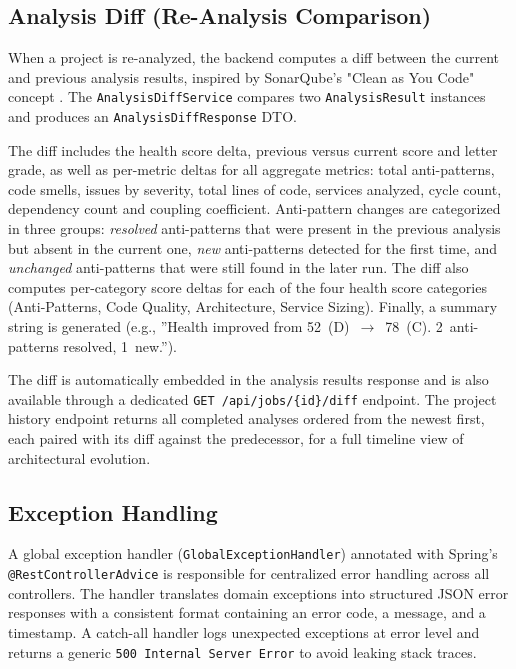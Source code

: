 \subsection{Analysis Diff (Re-Analysis Comparison)}
\label{subsec:analysis-diff}

 \par When a project is re-analyzed, the backend computes a diff between the current and previous analysis results, inspired by SonarQube's "Clean as You Code" concept \cite{SonQ}. The \texttt{AnalysisDiffService} compares two \texttt{AnalysisResult} instances and produces an \texttt{AnalysisDiffResponse} DTO.

The diff includes the health score delta, previous versus current score and letter grade, as well as per-metric deltas for all aggregate metrics: total anti-patterns, code smells, issues by severity, total lines of code, services analyzed, cycle count, dependency count and coupling coefficient. Anti-pattern changes are categorized in three groups: \textit{resolved} anti-patterns that were present in the previous analysis but absent in the current one, \textit{new} anti-patterns detected for the first time, and \textit{unchanged} anti-patterns that were still found in the later run. The diff also computes per-category score deltas for each of the four health score categories (Anti-Patterns, Code Quality, Architecture, Service Sizing). Finally, a summary string is generated (e.g., ''Health improved from 52~(D)~$\to$~78~(C). 2~anti-patterns resolved, 1~new.'').

The diff is automatically embedded in the analysis results response and is also available through a dedicated \texttt{GET /api/jobs/\{id\}/diff} endpoint. The project history endpoint returns all completed analyses ordered from the newest first, each paired with its diff against the predecessor, for a full timeline view of architectural evolution.

\subsection{Exception Handling}
\label{subsec:exception-handling}

 \par A global exception handler (\texttt{GlobalExceptionHandler}) annotated with Spring's \texttt{@RestControllerAdvice} is responsible for centralized error handling across all controllers. The handler translates domain exceptions into structured JSON error responses with a consistent format containing an error code, a message, and a timestamp. A catch-all handler logs unexpected exceptions at error level and returns a generic \texttt{500 Internal Server Error} to avoid leaking stack traces.

